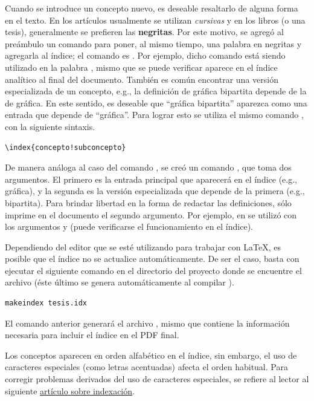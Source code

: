 Cuando se introduce un concepto nuevo, es deseable resaltarlo de alguna forma en
el texto.   En los art\'iculos usualmente se utilizan \textit{cursivas} y en los
libros (o una tesis), generalmente se prefieren las \textbf{negritas}.   Por
este motivo, se agreg\'o al pre\'ambulo un comando para poner, al mismo tiempo,
una palabra en negritas y agregarla al \'indice; el comando es
.   Por ejemplo, dicho comando est\'a siendo
utilizado en la palabra , mismo que se puede verificar aparece
en el \'indice anal\'itico al final del documento. Tambi\'en es com\'un
encontrar una versi\'on especializada de un concepto, e.g., la definici\'on de
gr\'afica bipartita depende de la de gr\'afica.   En este sentido, es deseable
que ``gr\'afica bipartita'' aparezca como una entrada que depende de
``gr\'afica''.   Para lograr esto se utiliza el mismo comando
, con la siguiente sintaxis.
\begin{lstlisting}
\index{concepto!subconcepto}
\end{lstlisting}

De manera an\'aloga al caso del comando , se cre\'o
un comando , que toma dos argumentos.  El primero
es la entrada principal que aparecer\'a en el \'indice (e.g., gr\'afica), y la
segunda es la versi\'on especializada que depende de la primera (e.g.,
bipartita).   Para brindar libertad en la forma de redactar las definiciones,
 s\'olo imprime en el documento el segundo
argumento.   Por ejemplo, en  se utiliz\'o
 con los argumentos  y
 (puede verificarse el funcionamiento en el \'indice).

Dependiendo del editor que se est\'e utilizando para trabajar con \LaTeX, es
posible que el \'indice no se actualice autom\'aticamente.   De ser el caso,
basta con ejecutar el siguiente comando en el directorio del proyecto donde se
encuentre el archivo  (\'este \'ultimo se genera
autom\'aticamente al compilar ).
\lstset{language=bash}
\begin{lstlisting}
makeindex tesis.idx
\end{lstlisting}

El comando anterior generar\'a el archivo , mismo que contiene la
informaci\'on necesaria para incluir el \'indice en el PDF final.

Los conceptos aparecen en orden alfab\'etico en el \'indice, sin embargo, el uso
de caracteres especiales (como letras acentuadas) afecta el orden habitual.
Para corregir problemas derivados del uso de caracteres especiales, se refiere
al lector al siguiente \href{https://en.wikibooks.org/wiki/LaTeX/%
Indexing#Using_special_characters}{art\'iculo sobre indexaci\'on}.
